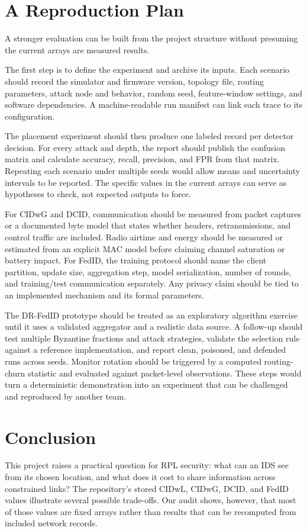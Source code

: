 \documentclass[conference]{IEEEtran}
\begin{document}
\section{A Reproduction Plan}
A stronger evaluation can be built from the project structure without presuming the current arrays are measured results.

The first step is to define the experiment and archive its inputs. Each scenario should record the simulator and firmware version, topology file, routing parameters, attack node and behavior, random seed, feature-window settings, and software dependencies. A machine-readable run manifest can link each trace to its configuration.

The placement experiment should then produce one labeled record per detector decision. For every attack and depth, the report should publish the confusion matrix and calculate accuracy, recall, precision, and FPR from that matrix. Repeating each scenario under multiple seeds would allow means and uncertainty intervals to be reported. The specific values in the current arrays can serve as hypotheses to check, not expected outputs to force.

For CIDwG and DCID, communication should be measured from packet captures or a documented byte model that states whether headers, retransmissions, and control traffic are included. Radio airtime and energy should be measured or estimated from an explicit MAC model before claiming channel saturation or battery impact. For FedID, the training protocol should name the client partition, update size, aggregation step, model serialization, number of rounds, and training/test communication separately. Any privacy claim should be tied to an implemented mechanism and its formal parameters.

The DR-FedID prototype should be treated as an exploratory algorithm exercise until it uses a validated aggregator and a realistic data source. A follow-up should test multiple Byzantine fractions and attack strategies, validate the selection rule against a reference implementation, and report clean, poisoned, and defended runs across seeds. Monitor rotation should be triggered by a computed routing-churn statistic and evaluated against packet-level observations. These steps would turn a deterministic demonstration into an experiment that can be challenged and reproduced by another team.

\section{Conclusion}
This project raises a practical question for RPL security: what can an IDS see from its chosen location, and what does it cost to share information across constrained links? The repository's stored CIDwL, CIDwG, DCID, and FedID values illustrate several possible trade-offs. Our audit shows, however, that most of those values are fixed arrays rather than results that can be recomputed from included network records.
\end{document}
